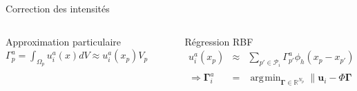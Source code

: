 \documentclass[aspectratio=169]{beamer} %
\DeclareMathOperator*{\argmin}{\arg\!\min}
\begin{document}
\begin{frame}{Correction des intensités}
    \begin{columns}[t]
        \begin{column}{0.4\textwidth}
            \begin{exampleblock}{Approximation particulaire}
                $\Gamma^a_p = \int_{\Omega_p} u^a_i(x) dV \approx u^a_i(x_p) V_p$
            \end{exampleblock}
        \end{column}
        \begin{column}{0.6\textwidth}
            \begin{exampleblock}{Régression RBF}
                \begin{eqnarray*}
                    u^a_i(x_p) &\approx& \sum_{p' \in \mathcal P_i} \Gamma^a_{p'} \phi_h(x_p - x_{p'}), \quad p \in \mathcal P_i \Rightarrow \bm u_i \approx \Phi \bm \Gamma_i\\
                    \Rightarrow \bm \Gamma_i^a &=& \argmin_{\bm \Gamma \in \mathbb R^{N_p}} \| \bm u_i - \Phi \bm \Gamma\|_2^2 + R(\bm \Gamma)
                \end{eqnarray*}
            \end{exampleblock}
        \end{column}
    \end{columns}
\end{frame}
\end{document}
